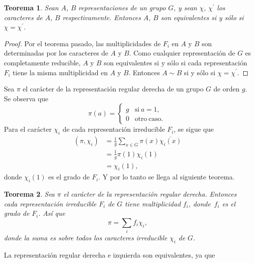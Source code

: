 \documentclass[12pt]{book}
\newtheorem{theorem}{Teorema}[section]
\theoremstyle{definition}
\newcounter{in}
\begin{document}
\begin{theorem}
  \label{t4_6}
  Sean $A$, $B$ representaciones de un grupo $G$, y sean $\chi$,
  $\chi^{'}$ los caracteres de $A$, $B$ respectivamente. Entonces $A$,
  $B$ son equivalentes si y sólo si $\chi=\chi^{'}$.
\end{theorem}

\begin{proof}
  Por el teorema pasado, las multiplicidades de $F_{i}$ en $A$ y $B$
  son determinadas por los caracteres de $A$ y $B$. Como cualquier
  representación de $G$ es completamente reducible, $A$ y $B$ son
  equivalentes si y sólo si cada representación $F_{i}$ tiene la misma
  multiplicidad en $A$ y $B$. Entonces $A \sim B$ si y sólo si $\chi=\chi^{'}$.
\end{proof}

Sea $\pi$ el carácter de la representación regular derecha de un grupo
$G$ de orden $g$. Se observa que
\begin{equation}
  \label{eq:39}
   \pi(a) = \left\{
     \begin{array}{ll}
       g      & \mathrm{si\ } a = 1, \\
       0      & \mathrm{otro\ caso.\ } 
     \end{array}
   \right.
\end{equation}
Para el carácter $\chi_{i}$ de cada representación irreducible
$F_{i}$, se sigue que
\begin{equation}
  \label{eq:40}
  \begin{aligned}
    (\pi,\chi_{i}) & =\frac{1}{g} \sum_{x \in G} \pi(x) \overline{\chi_{i}(x)} \\
    &=\frac{1}{g} \pi(1) \chi_{i}(1) \\
    &=\chi_{i}(1),
  \end{aligned}
\end{equation}
donde $\chi_{i}(1)$ es el grado de $F_{i}$. Y por lo tanto se llega al
siguiente teorema.
\begin{theorem}
  \label{t4_7}
  Sea $\pi$ el carácter de la representación regular derecha. Entonces
  cada representación irreducible $F_{i}$ de $G$ tiene multiplicidad
  $f_{i}$, donde~$f_{i}$ es el grado de $F_{i}$. Así que
  \begin{equation*}
    \pi=\sum_{i} f_{i} \chi_{i},
  \end{equation*}
  donde la suma es sobre todos los caracteres irreducible $\chi_{i}$ de $G$.
\end{theorem}
La representación regular derecha e izquierda son equivalentes, ya que
\end{document}
